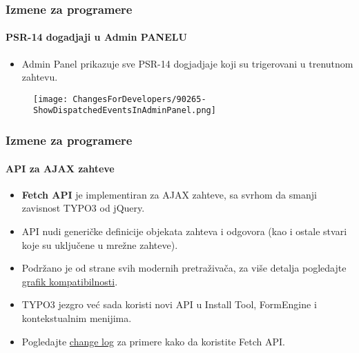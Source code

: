 
\begin{frame}[fragile]
	\frametitle{Izmene za programere}
	\framesubtitle{PSR-14 dogadjaji u Admin PANELU}

	\begin{itemize}
		\item Admin Panel prikazuje sve PSR-14 dogjadjaje koji su trigerovani u trenutnom zahtevu.
	\end{itemize}

	\begin{figure}
		\texttt{[image: ChangesForDevelopers/90265-ShowDispatchedEventsInAdminPanel.png]}
	\end{figure}

\end{frame}


\begin{frame}[fragile]
	\frametitle{Izmene za programere}
	\framesubtitle{API za AJAX zahteve}

	\lstset{basicstyle=\tiny\ttfamily}

	\begin{itemize}
		\item \textbf{Fetch API} je implementiran za AJAX zahteve, sa svrhom da smanji zavisnost TYPO3 od jQuery.
		\item API nudi generičke definicije objekata zahteva i odgovora
			(kao i ostale stvari koje su uključene u mrežne zahteve).
		\item Podržano je od strane svih modernih pretraživača, za više detalja pogledajte
			\href{https://developer.mozilla.org/en-US/docs/Web/API/Fetch_API}{grafik kompatibilnosti}.
		\item TYPO3 jezgro već sada koristi novi API u Install Tool, FormEngine i kontekstualnim menijima.
		\item Pogledajte
			\href{https://docs.typo3.org/c/typo3/cms-core/master/en-us/Changelog/10.3/Feature-89738-ApiForAjaxRequests.html}{change log}
			za primere kako da koristite Fetch API.

	\end{itemize}

\end{frame}

